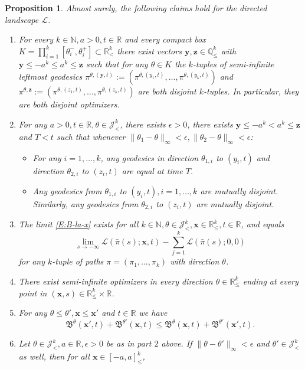 \documentclass[11pt]{article}
\newcommand{\Q}{\mathbb{Q}}
\newcommand{\N}{\mathbb{N}}
\newcommand{\R}{\mathbb{R}}
\newcommand{\ep}{\epsilon}
\newcommand{\cJ}{\mathcal{J}}
\newcommand{\cL}{\mathcal{L}}
\newcommand{\fB}{\mathfrak{B}}
\newcommand{\X}{\times}
\newcommand{\bx}{\mathbf{x}}
\newcommand{\by}{\mathbf{y}}
\newcommand{\bz}{\mathbf{z}}
\newtheorem{proposition}[theorem]{Proposition}
\theoremstyle{definition} %
\theoremstyle{remark} %
\begin{document}
\begin{proposition}
	\label{P:extended-usemann-landscape}
	Almost surely, the following claims hold for the directed landscape $\cL$.
	\begin{enumerate}
		\item For every $k \in \N, a > 0, t \in \R$ and every compact box $K = \prod_{i=1}^k [\theta_i^-, \theta_i^+]\subset \R^k_<$ there exist vectors $\by, \bz \in \Q^k_\le$ with $\by \le -a^k \le a^k \le \bz$ such that for any $\theta \in K$ the $k$-tuples of semi-infinite leftmost geodesics $\pi^{\theta, (\by, t)} := (\pi^{\theta, (y_1, t)}, \dots, \pi^{\theta, (y_k, t)})$ and $\pi^{\theta, \bz} := (\pi^{\theta, (z_1, t)}, \dots, \pi^{\theta, (z_k, t)})$ are both disjoint $k$-tuples. In particular, they are both disjoint optimizers.
		\item For any $a > 0, t \in \R, \theta \in \cJ^k_<$, there exists $\ep > 0$, there exists $\by \le -a^k < a^k \le \bz$ and $T < t$ such that whenever $\|\theta_1 - \theta\|_\infty < \ep, \|\theta_2 - \theta\|_\infty < \ep$:
		\begin{itemize}
			\item For any $i = 1, \dots, k$, any geodesics in direction $\theta_{1, i}$ to $(y_i, t)$ and direction $\theta_{2, i}$ to $(z_i, t)$ are equal at time $T$.
			\item Any geodesics from $\theta_{1, i}$ to $(y_i, t), i = 1, \dots, k$ are mutually disjoint. Similarly, any geodesics from $\theta_{2, i}$ to $(z_i, t)$ are mutually disjoint.
		\end{itemize}
		\item The limit \eqref{E:B-la-x} exists for all $k \in \N, \theta \in \cJ^k_<, \bx \in \R^k_\le, t \in \R$, and equals
		$$
		\lim_{s \to -\infty}  \cL(\bar \pi(s) ; \bx, t) - \sum_{j=1}^{k} \cL(\bar\pi(s); 0, 0) 
		$$
		for any $k$-tuple of paths $\pi = (\pi_1, \dots, \pi_k)$ with direction $\theta$.
		\item There exist semi-infinite optimizers in every direction $\theta \in \R^k_\le$ ending at every point in $(\bx, s) \in \R^k_\le \X \R$. 
		\item For any $\theta \le \theta', \bx \le \bx'$ and $t \in \R$ we have
		$$
		\fB^\theta(\bx', t) + \fB^{\theta'}(\bx, t) \le \fB^\theta(\bx, t) + \fB^{\theta'}(\bx', t).
		$$
				\item Let $\theta \in \cJ^k_<, a\in \R, \ep > 0$ be as in part $2$ above. If $\|\theta - \theta'\|_\infty < \ep$ and $\theta' \in \cJ^k_<$ as well, then for all $\bx \in [-a, a]^k_\le$,\begin{flushleft}
					

\end{flushleft}
\end{enumerate}
\end{proposition}
\end{document}
